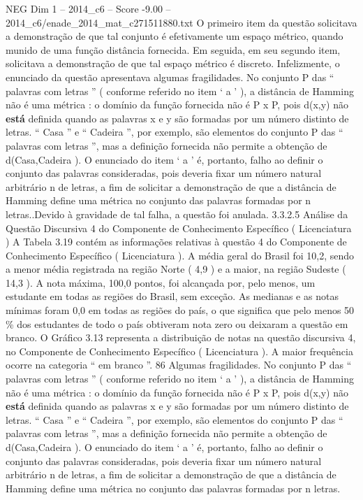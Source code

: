 \begin{textsample}{NEG Dim 1 – 2014\_c6 – Score -9.00 – 2014\_c6/enade\_2014\_mat\_c271511880.txt}
O primeiro item da questão solicitava a demonstração de que tal conjunto é efetivamente um espaço métrico, quando munido de uma função distância fornecida.
Em seguida, em seu segundo item, solicitava a demonstração de que tal espaço métrico é discreto.
Infelizmente, o enunciado da questão apresentava algumas fragilidades.
No conjunto P das “ palavras com letras ” ( conforme referido no item ‘ a ’ ), a distância de Hamming não é uma métrica : o domínio da função fornecida não é P x P, pois d(x,y) não \textbf{está} definida quando as palavras x e y são formadas por um número distinto de letras. “ Casa ” e “ Cadeira ”, por exemplo, são elementos do conjunto P das “ palavras com letras ”, mas a definição fornecida não permite a obtenção de d(Casa,Cadeira ).
O enunciado do item ‘ a ’ é, portanto, falho ao definir o conjunto das palavras consideradas, pois deveria fixar um número natural arbitrário n de letras, a fim de solicitar a demonstração de que a distância de Hamming define uma métrica no conjunto das palavras formadas por n letras..Devido à gravidade de tal falha, a questão foi anulada. 3.3.2.5 Análise da Questão Discursiva 4 do Componente de Conhecimento Específico ( Licenciatura ) A Tabela 3.19 contém as informações relativas à questão 4 do Componente de Conhecimento Específico ( Licenciatura ).
A média geral do Brasil foi 10,2, sendo a menor média registrada na região Norte ( 4,9 ) e a maior, na região Sudeste ( 14,3 ).
A nota máxima, 100,0 pontos, foi alcançada por, pelo menos, um estudante em todas as regiões do Brasil, sem exceção.
As medianas e as notas mínimas foram 0,0 em todas as regiões do país, o que significa que pelo menos 50 \% dos estudantes de todo o país obtiveram nota zero ou deixaram a questão em branco.
O Gráfico 3.13 representa a distribuição de notas na questão discursiva 4, no Componente de Conhecimento Específico ( Licenciatura ).
A maior frequência ocorre na categoria “ em branco ”. 86 Algumas fragilidades.
No conjunto P das “ palavras com letras ” ( conforme referido no item ‘ a ’ ), a distância de Hamming não é uma métrica : o domínio da função fornecida não é P x P, pois d(x,y) não \textbf{está} definida quando as palavras x e y são formadas por um número distinto de letras. “ Casa ” e “ Cadeira ”, por exemplo, são elementos do conjunto P das “ palavras com letras ”, mas a definição fornecida não permite a obtenção de d(Casa,Cadeira ).
O enunciado do item ‘ a ’ é, portanto, falho ao definir o conjunto das palavras consideradas, pois deveria fixar um número natural arbitrário n de letras, a fim de solicitar a demonstração de que a distância de Hamming define uma métrica no conjunto das palavras formadas por n letras.

\end{textsample}
